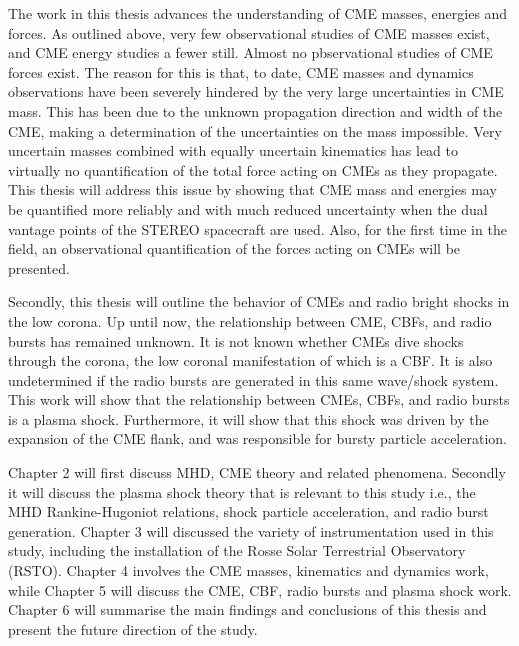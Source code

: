The work in this thesis advances the understanding of CME masses, energies and forces. As outlined above, very few observational studies of CME masses exist, and CME energy studies a fewer still. Almost no pbservational studies of CME forces exist. The reason for this is that, to date, CME masses and dynamics observations have been severely hindered by the very large uncertainties in CME mass. This has been due to the unknown propagation direction and width of the CME, making a determination of the uncertainties on the mass impossible. Very uncertain masses combined with equally uncertain kinematics has lead to virtually no quantification of the total force acting on CMEs as they propagate. This thesis will address this issue by showing that CME mass and energies may be quantified more reliably and with much reduced uncertainty when the dual vantage points of the STEREO spacecraft are used. Also, for the first time in the field, an observational quantification of the forces acting on CMEs will be presented. 

Secondly, this thesis will outline the behavior of CMEs and radio bright shocks in the low corona. Up until now, the relationship between CME, CBFs, and radio bursts has remained unknown. It is not known whether CMEs dive shocks through the corona, the low coronal manifestation of which is a CBF. It is also undetermined if the radio bursts are generated in this same wave/shock system. This work will show that the relationship between CMEs, CBFs, and radio bursts is a plasma shock. Furthermore, it will show that this shock was driven by the expansion of the CME flank, and was responsible for bursty particle acceleration.

Chapter 2 will first discuss MHD, CME theory and related phenomena. Secondly it will discuss the plasma shock theory that is relevant to this study i.e., the MHD Rankine-Hugoniot relations, shock particle acceleration, and radio burst generation. Chapter 3 will discussed the variety of instrumentation used in this study, including the installation of the Rosse Solar Terrestrial Observatory (RSTO). Chapter 4 involves the CME masses, kinematics and dynamics work, while Chapter 5 will discuss the CME, CBF, radio bursts and plasma shock work. Chapter 6 will summarise the main findings and conclusions of this thesis and present the future direction of the study.
